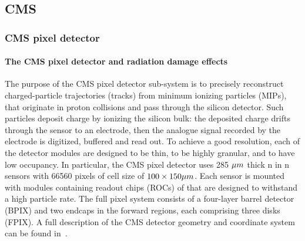 \subsection{CMS}
\label{sec:CMS}
\subsubsection{CMS pixel detector}

 \paragraph{The CMS pixel detector and radiation damage effects}
 
The purpose of the CMS pixel detector sub-system is to precisely reconstruct charged-particle trajectories (tracks) from minimum ionizing particles (MIPs), that originate in proton collisions and pass through the silicon detector.
Such particles deposit charge by ionizing the silicon bulk: the deposited charge drifts through the sensor to an electrode, then the analogue signal recorded by the electrode is digitized, buffered and read out. 
To achieve a good resolution, each of the detector modules are designed to be thin, to be highly granular, and to have low occupancy.
In particular, the CMS pixel detector uses 285 $\micro m$ thick n in n sensors with 66560 pixels of cell size of $100\times 150 \micro m$.
Each sensor is mounted with modules containing readout chips (ROCs) of that are designed to withstand a high particle rate.
The full pixel system consists of a four-layer barrel detector (BPIX) and two endcaps in the forward regions, each comprising three disks (FPIX).
A full description of the CMS detector geometry and coordinate system can be found in~\cite{Chatrchyan:2008aa,tdr}.

